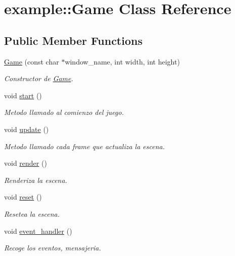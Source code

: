 \hypertarget{classexample_1_1_game}{}\section{example\+::Game Class Reference}
\label{classexample_1_1_game}
\subsection*{Public Member Functions}
\begin{DoxyCompactItemize}
\item 
\mbox{\hyperlink{classexample_1_1_game_aa48d674dcf9bd1c4847157a763f9e356}{Game}} (const char $\ast$window\+\_\+name, int width, int height)
\begin{DoxyCompactList}\small\item\em Constructor de \mbox{\hyperlink{classexample_1_1_game}{Game}}. \end{DoxyCompactList}\item 
void \mbox{\hyperlink{classexample_1_1_game_adffce1cd51d04cb325a60f3fb76f1fb1}{start}} ()
\begin{DoxyCompactList}\small\item\em Metodo llamado al comienzo del juego. \end{DoxyCompactList}\item 
void \mbox{\hyperlink{classexample_1_1_game_a01f28031d3b384412bdac6e433171743}{update}} ()
\begin{DoxyCompactList}\small\item\em Metodo llamado cada frame que actualiza la escena. \end{DoxyCompactList}\item 
void \mbox{\hyperlink{classexample_1_1_game_a80ca8afc0d6e9d533d4b7ea0fd333381}{render}} ()
\begin{DoxyCompactList}\small\item\em Renderiza la escena. \end{DoxyCompactList}\item 
void \mbox{\hyperlink{classexample_1_1_game_a3f27f46dd53f8fe477772c2e6bbbef60}{reset}} ()
\begin{DoxyCompactList}\small\item\em Resetea la escena. \end{DoxyCompactList}\item 
void \mbox{\hyperlink{classexample_1_1_game_ae4383cfb01609df636d51184e1b4fa63}{event\+\_\+handler}} ()
\begin{DoxyCompactList}\small\item\em Recoge los eventos, mensajeria. \end{DoxyCompactList}\end{DoxyCompactItemize}


